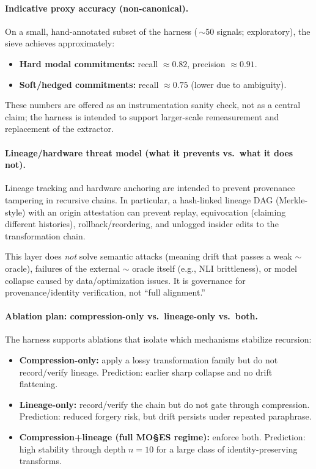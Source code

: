 \documentclass[11pt,a4paper]{article}
\begin{document}
\paragraph{Indicative proxy accuracy (non-canonical).}
On a small, hand-annotated subset of the harness (\,$\sim 50$ signals; exploratory), the sieve achieves approximately:
\begin{itemize}
    \item \textbf{Hard modal commitments:} recall $\approx 0.82$, precision $\approx 0.91$.
    \item \textbf{Soft/hedged commitments:} recall $\approx 0.75$ (lower due to ambiguity).
\end{itemize}
These numbers are offered as an instrumentation sanity check, not as a central claim; the harness is intended to support larger-scale remeasurement and replacement of the extractor.

\paragraph{Lineage/hardware threat model (what it prevents vs.\ what it does not).}
Lineage tracking and hardware anchoring are intended to prevent provenance tampering in recursive chains. In particular, a hash-linked lineage DAG (Merkle-style) with an origin attestation can prevent replay, equivocation (claiming different histories), rollback/reordering, and unlogged insider edits to the transformation chain.

This layer does \emph{not} solve semantic attacks (meaning drift that passes a weak $\sim$ oracle), failures of the external $\sim$ oracle itself (e.g., NLI brittleness), or model collapse caused by data/optimization issues. It is governance for provenance/identity verification, not ``full alignment.''

\paragraph{Ablation plan: compression-only vs.\ lineage-only vs.\ both.}
The harness supports ablations that isolate which mechanisms stabilize recursion:
\begin{itemize}
    \item \textbf{Compression-only:} apply a lossy transformation family but do not record/verify lineage. Prediction: earlier sharp collapse and no drift flattening.
    \item \textbf{Lineage-only:} record/verify the chain but do not gate through compression. Prediction: reduced forgery risk, but drift persists under repeated paraphrase.
    \item \textbf{Compression+lineage (full MO\S{}ES\texttrademark{} regime):} enforce both. Prediction: high stability through depth $n=10$ for a large class of identity-preserving transforms.
\end{itemize}
\end{document}
